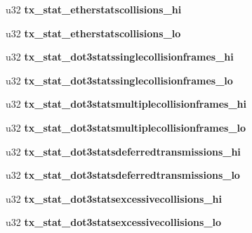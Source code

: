 \begin{DoxyCompactItemize}
\item 
\hypertarget{structmac__stx_a0a267c2d19ca120a013b65f28f9c532d}{
u32 {\bfseries tx\_\-stat\_\-etherstatscollisions\_\-hi}}
\label{structmac__stx_a0a267c2d19ca120a013b65f28f9c532d}

\item 
\hypertarget{structmac__stx_aabbbb71ac926841b63d0f790ec4e22b9}{
u32 {\bfseries tx\_\-stat\_\-etherstatscollisions\_\-lo}}
\label{structmac__stx_aabbbb71ac926841b63d0f790ec4e22b9}

\item 
\hypertarget{structmac__stx_aa4b1620859604244b3b3a81d028ca3ff}{
u32 {\bfseries tx\_\-stat\_\-dot3statssinglecollisionframes\_\-hi}}
\label{structmac__stx_aa4b1620859604244b3b3a81d028ca3ff}

\item 
\hypertarget{structmac__stx_a881a228fd4911125cb65f247ada15bc4}{
u32 {\bfseries tx\_\-stat\_\-dot3statssinglecollisionframes\_\-lo}}
\label{structmac__stx_a881a228fd4911125cb65f247ada15bc4}

\item 
\hypertarget{structmac__stx_ab57a09173dcbe62225bdba5620ddf9fd}{
u32 {\bfseries tx\_\-stat\_\-dot3statsmultiplecollisionframes\_\-hi}}
\label{structmac__stx_ab57a09173dcbe62225bdba5620ddf9fd}

\item 
\hypertarget{structmac__stx_ae158e4db9031a1d6c0a6570e8d826087}{
u32 {\bfseries tx\_\-stat\_\-dot3statsmultiplecollisionframes\_\-lo}}
\label{structmac__stx_ae158e4db9031a1d6c0a6570e8d826087}

\item 
\hypertarget{structmac__stx_aa69ef20b2d46fe24dd01c5e2fbff5925}{
u32 {\bfseries tx\_\-stat\_\-dot3statsdeferredtransmissions\_\-hi}}
\label{structmac__stx_aa69ef20b2d46fe24dd01c5e2fbff5925}

\item 
\hypertarget{structmac__stx_af6ef20e0ae594a4217bcb0905e115704}{
u32 {\bfseries tx\_\-stat\_\-dot3statsdeferredtransmissions\_\-lo}}
\label{structmac__stx_af6ef20e0ae594a4217bcb0905e115704}

\item 
\hypertarget{structmac__stx_a4b6446d7d5072189f6ee1794a4439562}{
u32 {\bfseries tx\_\-stat\_\-dot3statsexcessivecollisions\_\-hi}}
\label{structmac__stx_a4b6446d7d5072189f6ee1794a4439562}

\item 
\hypertarget{structmac__stx_a9a087fbb9f1a6331461e8f35cc5c99c9}{
u32 {\bfseries tx\_\-stat\_\-dot3statsexcessivecollisions\_\-lo}}
\label{structmac__stx_a9a087fbb9f1a6331461e8f35cc5c99c9}


\end{DoxyCompactItemize}
